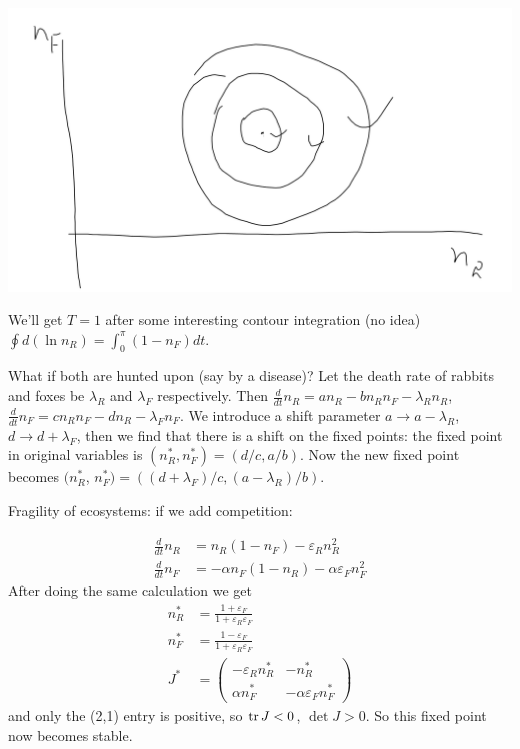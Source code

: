 \documentclass[a4paper]{article}
\begin{document}
\includegraphics[scale=0.5]{image/Bio_14.png}

We'll get $T=1$ after some interesting contour integration (no idea) $\oint d(\ln n_R ) = \int_0^\pi (1-n_F)dt$.

What if both are hunted upon (say by a disease)? Let the death rate of rabbits and foxes be $\lambda_R$ and $\lambda_F$ respectively. Then $\frac{d}{dt} n_R = an_R - bn_Rn_F - \lambda_R n_R$, $\frac{d}{dt} n_F = cn_Rn_F - dn_R-\lambda_F n_F$. We introduce a shift parameter $a \to a-\lambda_R$, $d \to d+\lambda_F$, then we find that there is a shift on the fixed points: the fixed point in original variables is $(n^*_R,n^*_F) = (d/c,a/b)$. Now the new fixed point becomes $(n^*_R$, $n^*_F) =((d+\lambda_F)/c,(a-\lambda_R)/b)$.

Fragility of ecosystems: if we add competition:

\begin{equation*}
\begin{aligned}
\frac{d}{dt} n_R &= n_R(1-n_F) - \varepsilon_R n_R^2\\
\frac{d}{dt} n_F &= -\alpha n_F(1-n_R) - \alpha \varepsilon_F n_F^2
\end{aligned}
\end{equation*}
After doing the same calculation we get
\begin{equation*}
\begin{aligned}
n_R^* &= \frac{1+\varepsilon_F}{1+\varepsilon_R\varepsilon_F}\\
n_F^* &= \frac{1-\varepsilon_F}{1+\varepsilon_R\varepsilon_F}\\
J^* &= \begin{pmatrix}
-\varepsilon_R n_R^* & -n_R^*\\
\alpha n_F^* & -\alpha\varepsilon_F n_F^*
\end{pmatrix}
\end{aligned}
\end{equation*}
and only the (2,1) entry is positive, so $\operatorname{tr} J <0$, $\det J >0$. So this fixed point now becomes stable.
\end{document}
